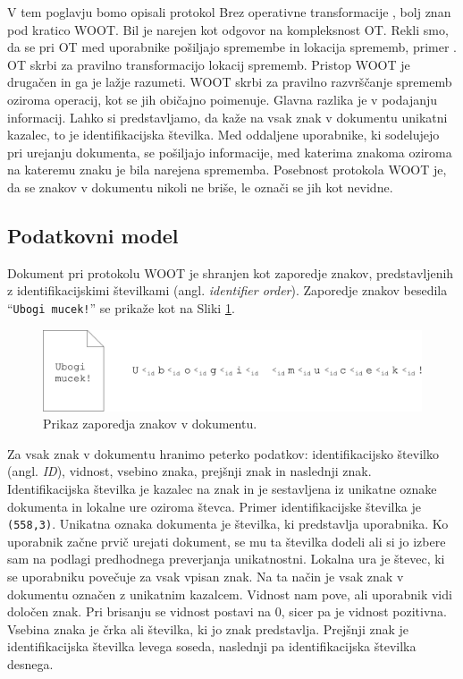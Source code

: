 \documentclass[a4paper, 12pt, twoside]{book}
\begin{document}
V tem poglavju bomo opisali protokol Brez operativne transformacije \cite{woot}, bolj znan pod kratico WOOT. Bil je narejen kot odgovor na kompleksnost OT. Rekli smo, da se \linebreak pri OT med uporabnike pošiljajo spremembe in lokacija sprememb, primer . OT skrbi za pravilno transformacijo lokacij sprememb. Pristop WOOT je drugačen in ga je lažje razumeti. WOOT skrbi za pravilno razvrščanje sprememb oziroma operacij, kot se jih običajno poimenuje. Glavna razlika je v podajanju informacij. Lahko si predstavljamo, da kaže na vsak znak v dokumentu unikatni kazalec, to je identifikacijska številka. Med oddaljene uporabnike, ki sodelujejo pri urejanju dokumenta, se pošiljajo informacije, med katerima znakoma oziroma na kateremu znaku je bila narejena sprememba. Posebnost protokola WOOT je, da se znakov v dokumentu nikoli ne briše, le označi se jih kot nevidne.

\subsection{Podatkovni model}
\label{subsec:pm}

Dokument pri protokolu WOOT je shranjen kot zaporedje znakov, predstavljenih z identifikacijskimi številkami (angl. \textit{identifier order}). Zaporedje znakov besedila “{\tt Ubogi mucek!}” se prikaže kot na Sliki \ref{woot1}.

\begin{figure}[placement h]
\begin{center}
\includegraphics[width=13cm]{img/woot1.pdf}
\end{center}
\caption{Prikaz zaporedja znakov v dokumentu.}
\label{woot1}
\end{figure}

Za vsak znak v dokumentu hranimo peterko podatkov: identifikacijsko številko (angl. \textit{ID}), vidnost, vsebino znaka, prejšnji znak in naslednji znak. Identifikacijska številka je kazalec na znak in je sestavljena iz unikatne oznake dokumenta in lokalne ure oziroma števca. Primer identifikacijske številka je {\tt (558,3)}. Unikatna oznaka dokumenta je številka, ki predstavlja uporabnika. Ko uporabnik začne prvič urejati dokument, se mu ta številka dodeli ali si jo izbere sam na podlagi predhodnega preverjanja unikatnostni. Lokalna ura je števec, ki se uporabniku povečuje za vsak vpisan znak. Na ta način je vsak znak v dokumentu označen z unikatnim kazalcem. Vidnost nam pove, ali uporabnik vidi določen znak. Pri brisanju se vidnost postavi na 0, sicer pa je vidnost pozitivna. Vsebina znaka je črka ali številka, ki jo znak predstavlja. Prejšnji znak je identifikacijska številka levega soseda, naslednji pa identifikacijska številka desnega.
\end{document}
